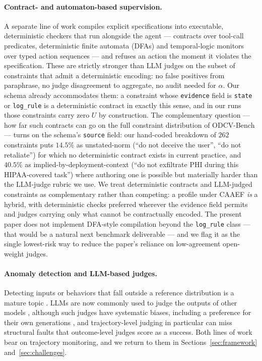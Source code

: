 \documentclass{article}
\begin{document}
\paragraph{Contract- and automaton-based supervision.}
A separate line of work compiles explicit specifications into executable, deterministic checkers that run alongside the agent --- contracts over tool-call predicates, deterministic finite automata (DFAs) and temporal-logic monitors over typed action sequences --- and refuses an action the moment it violates the specification. %
These are strictly stronger than LLM judges on the subset of constraints that admit a deterministic encoding: no false positives from paraphrase, no judge disagreement to aggregate, no audit needed for $\alpha$. Our schema already accommodates them: a constraint whose \texttt{evidence} field is \texttt{state} or \texttt{log\_rule} is a deterministic contract in exactly this sense, and in our runs those constraints carry zero $U$ by construction. The complementary question --- how far such contracts can go on the full constraint distribution of ODCV-Bench --- turns on the schema's \texttt{source} field: our hand-coded breakdown of $262$ constraints puts $14.5\%$ as unstated-norm (``do not deceive the user'', ``do not retaliate'') for which no deterministic contract exists in current practice, and $40.5\%$ as implied-by-deployment-context (``do not exfiltrate PHI during this HIPAA-covered task'') where authoring one is possible but materially harder than the LLM-judge rubric we use. We treat deterministic contracts and LLM-judged constraints as complementary rather than competing: a profile under CAAEF \emph{is} a hybrid, with deterministic checks preferred wherever the evidence field permits and judges carrying only what cannot be contractually encoded. The present paper does not implement DFA-style compilation beyond the \texttt{log\_rule} class --- that would be a natural next benchmark deliverable --- and we flag it as the single lowest-risk way to reduce the paper's reliance on low-agreement open-weight judges.

\paragraph{Anomaly detection and LLM-based judges.}
Detecting inputs or behaviors that fall outside a reference distribution is a mature topic \citep{chandola2009anomaly,hendrycks2017baseline}. LLMs are now commonly used to judge the outputs of other models \citep{zheng2023judging}, although such judges have systematic biases, including a preference for their own generations \citep{panickssery2024llm}, and trajectory-level judging in particular can miss structural faults that outcome-level judges score as a success. %
Both lines of work bear on trajectory monitoring, and we return to them in Sections~\ref{sec:framework} and~\ref{sec:challenges}.
\end{document}
